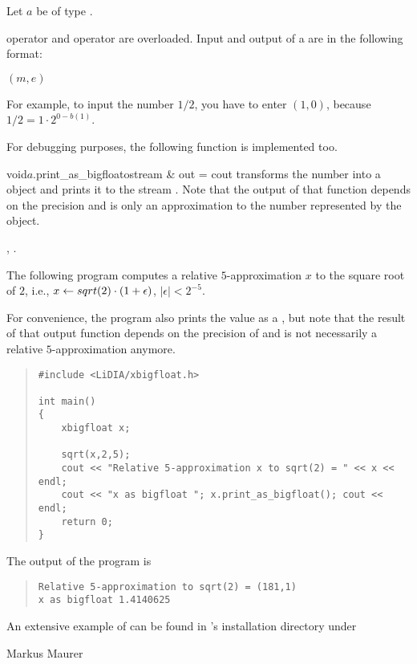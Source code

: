 \IO

Let $a$ be of type .

 operator \code{>>} and  operator \code{<<} are overloaded.  Input
and output of a  are in the following format:
\begin{center}
  $(m,e)$
\end{center}
For example, to input the number $1/2$, you have to enter $(1,0)$, because $1/2 = 1 \cdot
2^{0-b(1)}$.

For debugging purposes, the following function is implemented too.

\begin{cfcode}{void}{$a$.print_as_bigfloat}{ostream & out = cout}
  transforms the number into a  object and prints it to the stream .
  Note that the output of that function depends on the  precision and is
  only an approximation to the number represented by the  object.
\end{cfcode}




\SEEALSO

, .



\EXAMPLES

The following program computes a relative $5$-approximation $x$ to the square root of $2$, i.e.,
$x \leftarrow sqrt(2) \cdot (1+ \epsilon)$, $|\epsilon| < 2^{-5}$.

For convenience, the program also prints the value as a , but note that the
result of that output function depends on the precision of  and is not
necessarily a relative $5$-approximation anymore.

\begin{quote}
\begin{verbatim}
#include <LiDIA/xbigfloat.h>

int main()
{
    xbigfloat x;

    sqrt(x,2,5);
    cout << "Relative 5-approximation x to sqrt(2) = " << x << endl;
    cout << "x as bigfloat "; x.print_as_bigfloat(); cout << endl;
    return 0;
}
\end{verbatim}
\end{quote}

The output of the program is
\begin{quote}
\begin{verbatim}
Relative 5-approximation to sqrt(2) = (181,1)
x as bigfloat 1.4140625
\end{verbatim}
\end{quote}

An extensive example of  can be found in \LiDIA's installation directory under



\AUTHOR

Markus Maurer
